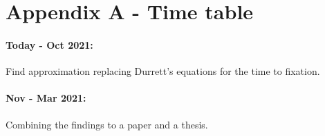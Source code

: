\documentclass[11pt]{article}
\begin{document}
\clearpage
\section{Appendix A - Time table}

\paragraph{Today - Oct 2021:}
Find approximation replacing Durrett's equations for the time to fixation.

\paragraph{Nov - Mar 2021:}
Combining the findings to a paper and a thesis.



\clearpage


\end{document}
